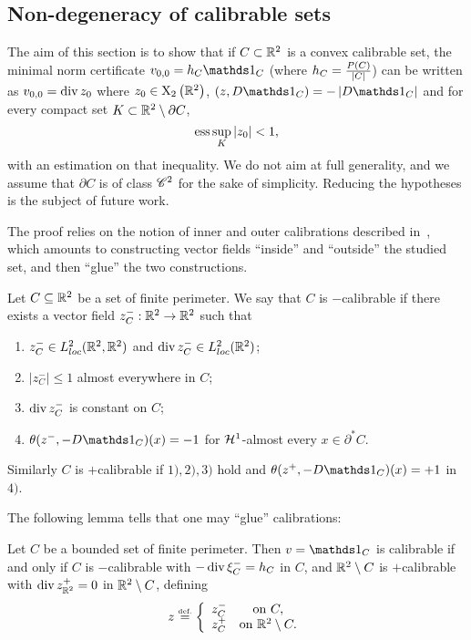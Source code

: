 \subsection{Non-degeneracy of calibrable sets}\label{sec:calibrable}

The aim of this section is to show that if $C\subset\mathbb{R}^2$ is a convex calibrable set, the minimal norm certificate $\voo=h_C\bun{C}$ (where $h_C=\frac{P(C)}{\left| C \right|}$) can be written as $v_{0,0}=\operatorname{div} z_0$ where $z_0\in \mathrm{X}_2\left(\mathbb{R}^2\right)$, $(z,D\bun{C})=-\abs{D\bun{C}}$ and for every compact set $K\subset \mathbb{R}^2\setminus \partial C$,
\begin{equation*}
  \operatorname{ess} \sup_{K} \left| z_0 \right| <1,
\end{equation*}
with an estimation on that inequality. We do not aim at full generality, and we assume that $\partial C$ is of class $\mathscr{C}^{2}$ for the sake of simplicity. Reducing the hypotheses is the subject of future work.

The proof relies on the notion of inner and outer calibrations described in~\cite{beltvflow02}, which amounts to constructing vector fields ``inside'' and ``outside'' the studied set, and then ``glue'' the two constructions.

\begin{defn}
Let $C \subseteq \mathbb{R}^2$ be a set of finite perimeter. We say that $C$ is $-$calibrable if there exists a vector field $z^-_C: \mathbb{R}^2\rightarrow \mathbb{R}^2$ 
such that 
\begin{enumerate}
  \item $z^-_C\in L^2_{loc}(\mathbb{R}^2,\mathbb{R}^2)$ and $\operatorname{div} z^-_C \in L^2_{loc}(\mathbb{R}^2)$;
  \item $|z^-_{C}| \leq 1$ almost everywhere in $C$;
  \item $\operatorname{div} z^-_C$ is constant on $C$;
  \item $\theta(z^-,-D\bun{C})(x)=-1$ for $\mathcal{H}^1$-almost every $x\in \partial^* C$.
\end{enumerate}
Similarly $C$ is $+$calibrable if $1),2),3)$ hold and $\theta(z^+,-D\bun{C})(x)=+1$ in $4)$.
\end{defn}
The following lemma tells that one may ``glue'' calibrations:
\begin{lem}
  Let  $C$ be a bounded set of finite perimeter. Then $v=\bun{C}$ is calibrable if and only if $C$ is $-$calibrable with $-\operatorname{div} \xi^-_{C}=h_C$ in $C$, and $\mathbb{R}^2\setminus C$ is $+$calibrable with $\operatorname{div} z^+_{\mathbb{R}^2}=0$ in $\mathbb{R}^2\setminus C$,
  defining
  \begin{align*}
    z\stackrel{\mbox{\upshape\tiny def.}}{=} \left\{ \begin{array}{cc}
        z^-_C & \mbox{on }  C,\\
        z^+_C & \mbox{on } \mathbb{R}^2\setminus C.
    \end{array}\right.
  \end{align*}
\end{lem}



